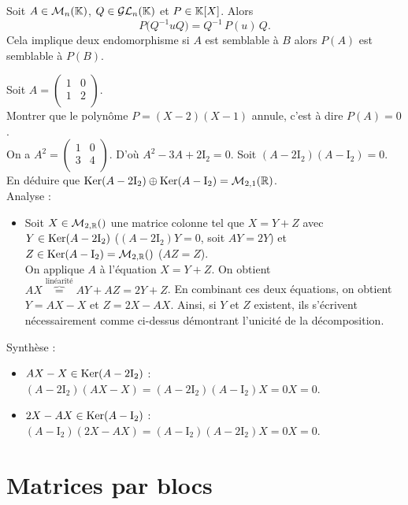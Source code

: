 \documentclass{book}
\begin{document}
\begin{Proposition}[Conjugaison]
Soit $A\in  \mathcal{M}_{n}(\mathbb{K})$, $Q\in  \mathcal{GL}_n(\mathbb{K})$ et $P\in  \mathbb{K} [X]$.
Alors
\[ P \bigl( Q^{-1}u Q \bigr) = Q^{-1} \, P(u) \, Q. \]
Cela implique deux endomorphisme si $A$ est semblable à $B$ alors $P(A)$ est semblable à $P(B)$.
\end{Proposition}
\begin{Exemple}
Soit $A=\begin{pmatrix}
1 &0 \\ 1&2\\
\end{pmatrix}$.\\
Montrer que le polynôme $P=(X-2)(X-1)$ annule, c'est à dire $P(A)=0$.\\
On a $A^2=\begin{pmatrix}
1 &0 \\ 3&4\\
\end{pmatrix}$. D'où $A^2-3A+2\mathrm{I}_2=0$. Soit  $(A-2\mathrm{I}_2)(A-\mathrm{I}_2)=0.$
En déduire que $\operatorname{Ker}(A-2\mathrm{I}_2)\oplus \operatorname{Ker}(A-\mathrm{I}_2)=\mathcal{M}_{2,1}(\mathbb{R})$.\\
Analyse :
\begin{itemize}
\item  Soit $X\in \M{2}{\R}$ une matrice colonne tel que $X=Y+Z$ avec  $Y\in \operatorname{Ker}(A-2\mathrm{I}_2)$ ($(A-2\mathrm{I}_2)Y=0$, soit $AY=2Y$) et  $Z\in\Ker(A-\mathrm{I}_2)=\M{2}{\R}$ ($AZ=Z$).\\
On applique $A$ à l'équation $X=Y+Z$. On obtient $AX\overbrace{=}^{\text{linéarité}}AY+AZ=2Y+Z$. En combinant ces deux équations, on obtient $Y=AX-X$ et $Z=2X-AX$. Ainsi, si $Y$ et $Z$ existent, ils s'écrivent nécessairement comme ci-dessus démontrant l'unicité de la décomposition.\\
\end{itemize}
Synthèse :
\begin{itemize}
\item $AX-X\in\operatorname{Ker}(A-2\mathrm{I}_2)$ :  $(A-2\mathrm{I}_2)(AX-X)=(A-2\mathrm{I}_2)(A-\mathrm{I}_2)X=0X=0.$
\item $2X-AX\in\operatorname{Ker}(A-\mathrm{I}_2)$ :  $(A-\mathrm{I}_2)(2X-AX)=(A-\mathrm{I}_2)(A-2\mathrm{I}_2)X=0X=0.$ 
\end{itemize}
\end{Exemple}



\section{Matrices par blocs}
\end{document}
